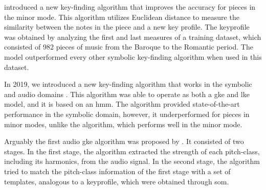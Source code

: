 \textcite{albrecht2013use} introduced a new key-finding
algorithm that improves the accuracy for pieces in the minor
mode. This algorithm utilizes Euclidean distance to measure
the similarity between the notes in the piece and a new key
profile. The \gls{keyprofile} was obtained by analyzing the
first and last measures of a training dataset, which
consisted of 982 pieces of music from the Baroque to the
Romantic period. The model outperformed every other symbolic
key-finding algorithm when used in this dataset.




In 2019, we introduced a new key-finding algorithm that
works in the symbolic and audio domains
\parencite{napoleslopez2019keyfinding}. This algorithm was
able to operate as both a \gls{gke} and \gls{lke} model, and
it is based on an \gls{hmm}. The algorithm provided
state-of-the-art performance in the symbolic domain,
however, it underperformed for pieces in minor modes, unlike
the \textcite{albrecht2013use} algorithm, which performs
well in the minor mode.





Arguably the first audio \gls{gke} algorithm was proposed by
\textcite{leman1992een}. It consisted of two stages. In the
first stage, the algorithm extracted the strength of each
pitch-class, including its harmonics, from the audio signal.
In the second stage, the algorithm tried to match the
pitch-class information of the first stage with a set of
templates, analogous to a \gls{keyprofile}, which were
obtained through \acrfull{som}.

